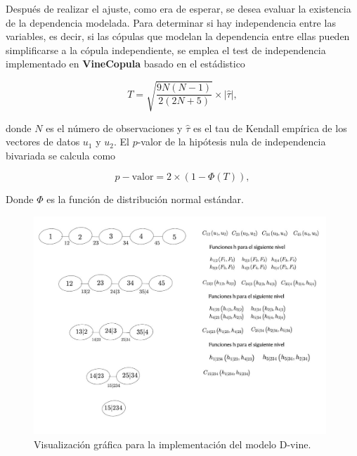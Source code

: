 Después de realizar el ajuste, como era de esperar, se desea evaluar la existencia de la dependencia modelada. Para determinar si hay independencia entre las variables, es decir, si las cópulas que modelan la dependencia entre ellas pueden simplificarse a la cópula independiente, se emplea el test de independencia implementado en \textbf{VineCopula} basado en el estádistico
    
\begin{equation}\label{T}
    T = \sqrt{\frac{9N(N - 1)}{2(2N + 5)}} \times |\hat{\tau}|,
\end{equation}

donde $N$ es el número de observaciones y $\hat{\tau}$ es el tau de Kendall empírica de los vectores de datos $u_1$ y $u_2$. El $p$-valor de la hipótesis nula de independencia bivariada se calcula como

\begin{equation}
    p-\text{valor} = 2 \times \left(1 - \Phi\left(T\right)\right),
\end{equation}


Donde $\Phi$ es la función de distribución normal estándar.

\begin{figure}[H]
    \centering
    \includegraphics[width = 0.98\textwidth]{Imagenes/Construccion.jpeg}
    \caption{Visualización gráfica para la implementación del modelo D-vine.}
    \label{fig:construccion}
\end{figure}


